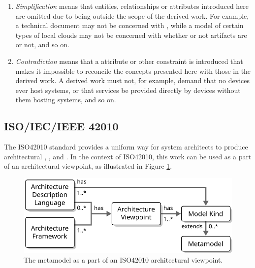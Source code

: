 \begin{enumerate}
\begin{enumerate}
	\item \textit{Simplification} means that entities, relationships or attributes introduced here are omitted due to being outside the scope of the derived work. For example, a technical document may not be concerned with , while a model of certain types of local clouds may not be concerned with whether or not artifacts are  or not, and so on.
	\item \textit{Contradiction} means that a attribute or other constraint is introduced that makes it impossible to reconcile the concepts presented here with those in the derived work. A derived work must not, for example, demand that no devices ever host systems, or that services be provided directly by devices without them hosting systems, and so on.
	\end{enumerate}
\end{enumerate}

\subsection{ISO/IEC/IEEE 42010}
\label{sec:conformance:iso42010}

The ISO42010 \cite{iso42010} standard provides a uniform way for system architects to produce architectural , ,  and .
In the context of ISO42010, this work can be used as a  part of an architectural viewpoint, as illustrated in Figure \ref{fig:iso42010}.

\begin{figure}[ht!]
  \centering
  \includegraphics[scale=0.9]{figures/iso42010}
  \caption{
    The metamodel as a part of an ISO42010 architectural viewpoint.
  }
  \label{fig:iso42010}
\end{figure}